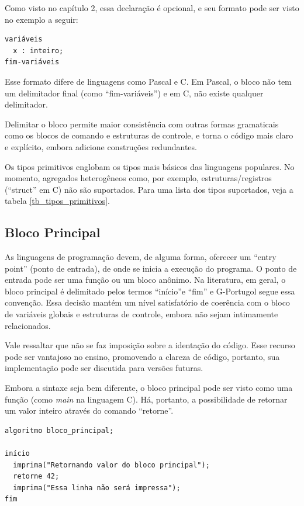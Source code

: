 \documentclass[a4paper,11pt]{report}
\begin{document}
Como visto no capítulo 2, essa declaração é opcional, e seu formato pode ser
visto no exemplo a seguir:

\begin{verbatim}
variáveis
  x : inteiro;
fim-variáveis
\end{verbatim}

Esse formato difere de linguagens como Pascal e C. Em Pascal, o bloco não tem um
delimitador final (como ``fim-variáveis'') e em C, não existe qualquer
delimitador.

Delimitar o bloco permite maior consistência com outras formas gramaticais como
os blocos de comando e estruturas de controle, e torna o código mais claro e
explícito, embora adicione construções redundantes.

Os tipos primitivos englobam os tipos mais básicos das linguagens populares. No
momento, agregados heterogêneos como, por exemplo, estruturas/registros
(``struct'' em C) não são suportados. Para uma lista dos tipos suportados, veja
a tabela \ref{tb_tipos_primitivos}.

\subsection{Bloco Principal}

As linguagens de programação devem, de alguma forma, oferecer um ``entry point''
(ponto de entrada), de onde se inicia a execução do programa. O ponto de entrada
pode ser uma função ou um bloco anônimo. Na literatura, em geral, o bloco
principal é delimitado pelos termos ``início''e ``fim'' e G-Portugol segue essa
convenção. Essa decisão mantém um nível satisfatório de coerência com o bloco de
variáveis globais e estruturas de controle, embora não sejam intimamente
relacionados.

Vale ressaltar que não se faz imposição sobre a identação do código. Esse
recurso pode ser vantajoso no ensino, promovendo a clareza de código, portanto,
sua implementação pode ser discutida para versões futuras.

Embora a sintaxe seja bem diferente, o bloco principal pode ser visto como uma
função (como \textit{main} na linguagem C). Há, portanto, a possibilidade de
retornar um valor inteiro através do comando ``retorne''.

\begin{program}
  \begin{verbatim}
algoritmo bloco_principal;

início
  imprima("Retornando valor do bloco principal");
  retorne 42;
  imprima("Essa linha não será impressa");
fim
  \end{verbatim}

  \caption{Bloco principal com comando retorne.}
\end{program}
\end{document}
